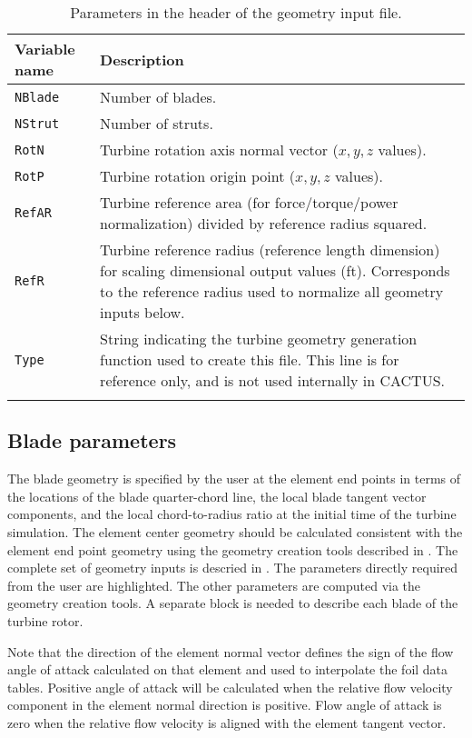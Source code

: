 \begin{table}[!htbp]
\centering
\caption{Parameters in the header of the geometry input file.}
\label{tbl:geometry_input_params_header}
\begin{tabular}{p{}p{}}
\toprule
Variable name & Description \\ \midrule
\texttt{NBlade} & Number of blades. \\
\texttt{NStrut} & Number of struts. \\
\texttt{RotN}   & Turbine rotation axis normal vector ($x,y,z$ values). \\
\texttt{RotP}   & Turbine rotation origin point ($x,y,z$ values). \\
\texttt{RefAR}  & Turbine reference area (for force/torque/power normalization) divided by reference radius squared. \\
\texttt{RefR}   & Turbine reference radius (reference length dimension) for scaling dimensional output values (ft). Corresponds to the reference radius used to normalize all geometry inputs below. \\
\texttt{Type}   & String indicating the turbine geometry generation function used to create this file. This line is for reference only, and is not used internally in CACTUS. \\
\bottomrule \\
\end{tabular}
\end{table}

\subsection{Blade parameters}
The blade geometry is specified by the user at the element end points in terms of the locations of the blade quarter-chord line, the local blade tangent vector components, and the local chord-to-radius ratio at the initial time of the turbine simulation. The element center geometry should be calculated consistent with the element end point geometry using the geometry creation tools described in . The complete set of geometry inputs is descried in . The parameters directly required from the user are highlighted. The other parameters are computed via the geometry creation tools. A separate block is needed to describe each blade of the turbine rotor.

Note that the direction of the element normal vector defines the sign of the flow angle of attack calculated on that element and used to interpolate the foil data tables. Positive angle of attack will be calculated when the relative flow velocity component in the element normal direction is positive. Flow angle of attack is zero when the relative flow velocity is aligned with the element tangent vector.


